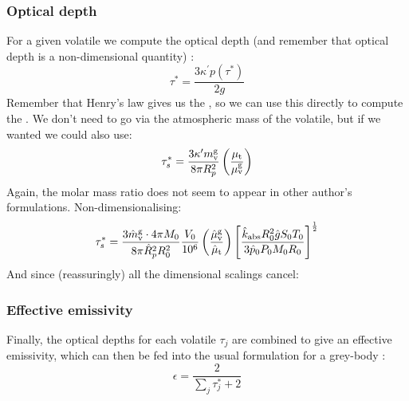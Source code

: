 \subsubsection{Optical depth}
For a given volatile we compute the optical depth (and remember that optical depth is a non-dimensional quantity)  \citep[Eq. A18,][]{AM85}:
\begin{equation}
\tau^\ast = \frac{3 \kappa^\prime p(\tau^\ast)}{2g}
\label{eq:tau}
\end{equation}
Remember that Henry's law gives us the , so we can use this directly to compute the .  We don't need to go via the atmospheric mass of the volatile, but if we wanted we could also use:
\begin{equation}
\tau^\ast_s = \frac{3 \kappa^\prime m_{\rm v}^{\rm g}}{8 \pi R_p^2} \left( \frac{\mu_{\rm t}}{\mu_{\rm v}^{\rm g}} \right)
\end{equation}
Again, the molar mass ratio does not seem to appear in other author's formulations.  Non-dimensionalising:
\begin{equation}
\tau^\ast_s = \frac{ 3 \hat{m}_{\rm v}^{\rm g} \cdot 4 \pi M_0}{8 \pi \hat{R}_p^2 R_0^2} \frac{V_0}{10^6} \left( \frac{\hat{\mu}_{\rm v}^{\rm g}}{\hat{\mu}_{\rm t}} \right) \left[ \frac{\hat{k}_{\rm abs} R_0^2 \hat{g} S_0 T_0}{3 \hat{p}_0 P_0 M_0 R_0} \right]^{\frac{1}{2}}
\end{equation}
And since (reassuringly) all the dimensional scalings cancel:
\subsubsection{Effective emissivity}
Finally, the optical depths for each volatile $\tau_j$  are combined to give an effective emissivity, which can then be fed into the usual formulation for a grey-body \citep[Eq. A14,][]{AM85}:
\begin{equation}
\epsilon = \frac{2}{\sum_j \tau_j^\ast +2}
\end{equation}
